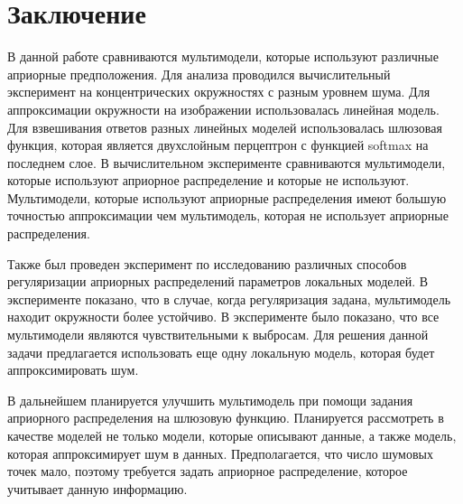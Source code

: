 \documentclass[12pt, twoside]{article}
\numberwithin{equation}{section}
\begin{document}
\section{Заключение}
В данной работе сравниваются мультимодели, которые используют различные априорные предположения. Для анализа проводился вычислительный эксперимент на концентрических окружностях с разным уровнем шума. Для аппроксимации окружности на изображении использовалась линейная модель. Для взвешивания ответов разных линейных моделей использовалась шлюзовая функция, которая является двухслойным перцептрон с функцией softmax на последнем слое.
В вычислительном эксперименте сравниваются мультимодели, которые используют априорное распределение и которые не используют. Мультимодели, которые используют априорные распределения имеют большую точностью аппроксимации чем мультимодель, которая не использует априорные распределения.

Также был проведен эксперимент по исследованию различных способов регуляризации априорных распределений параметров локальных моделей. В эксперименте показано, что в случае, когда регуляризация задана, мультимодель находит окружности более устойчиво. В эксперименте было показано, что все мультимодели являются чувствительными к выбросам. Для решения данной задачи предлагается использовать еще одну локальную модель, которая будет аппроксимировать шум.

В дальнейшем планируется улучшить мультимодель при помощи задания априорного распределения на шлюзовую функцию. Планируется рассмотреть в качестве моделей не только модели, которые описывают данные, а также модель, которая аппроксимирует шум в данных. Предполагается, что число шумовых точек мало, поэтому требуется задать априорное распределение, которое учитывает данную информацию.
\end{document}
